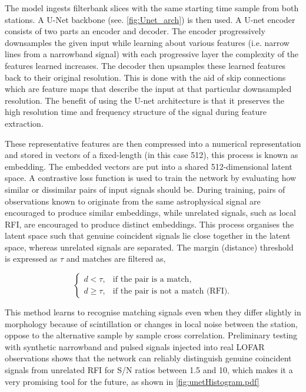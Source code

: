 The model ingests filterbank slices with the same starting time sample from both stations. A U-Net backbone (see. \cref{fig:Unet_arch}) is then used. A U-net encoder consists of two parts an encoder and decoder. The encoder progressively downsamples the given input while learning about various features (i.e. narrow lines from a narrowband signal) with each progressive layer the complexity of the features learned increases. The decoder then upsamples these learned features back to their original resolution. This is done with the aid of skip connections which are feature maps that describe the input at that particular downsampled resolution. 
The benefit of using the U-net architecture is that it preserves the high resolution time and frequency structure of the signal during feature extraction.

These representative features are then compressed into a numerical representation and stored in vectors of a fixed-length (in this case 512), this process is known as embedding. The embedded vectors are put into a shared 512-dimensional latent space. A contrastive loss function is used to train the network by evaluating how similar or dissimilar pairs of input signals should be. During training, pairs of observations known to originate from the same astrophysical signal are encouraged to produce similar embeddings, while unrelated signals, such as local RFI, are encouraged to produce distinct embeddings. This process organises the latent space such that genuine coincident signals lie close together in the latent space, whereas unrelated signals are separated. The margin (distance) threshold is expressed as $\tau$ and matches are filtered as, 

\begin{equation}
    \begin{cases}
d < \tau, & \text{if the pair is a match},\\[6pt]
d \geq \tau, & \text{if the pair is not a match (RFI)}.
\end{cases}
\end{equation}

This method learns to recognise matching signals even when they differ slightly in morphology because of scintillation or changes in local noise between the station, oppose to the alternative sample by sample cross correlation. Preliminary testing with synthetic narrowband and pulsed signals injected into real LOFAR observations shows that the network can reliably distinguish genuine coincident signals from unrelated RFI for S/N ratios between 1.5 and 10, which makes it a very promising tool for the future, as shown in \cref{fig:unetHistogram.pdf}

